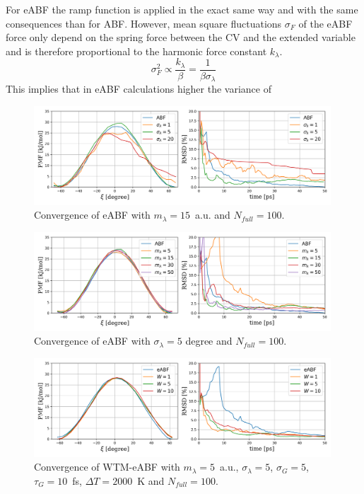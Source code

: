 For eABF the ramp function is applied in the exact same way and with the same consequences than for ABF.\autocite{lesage2017smoothed}
However, mean square fluctuations $\sigma_F$ of the eABF force only depend on the spring force between the CV and the extended variable and is therefore proportional to the harmonic force constant $k_\lambda$.
\begin{equation}
    \sigma_F^2 \propto \frac{k_\lambda}{\beta} = \frac{1}{\beta\sigma_\lambda}
\end{equation}
This implies that in eABF calculations higher the variance of
\begin{figure}[H]
  \centering
    \includegraphics[width=0.99\textwidth]{bilder/benchmark/eABF_benchmark_sigma}
   \caption{Convergence of eABF with $m_\lambda=15$~a.u. and $N_{full}=100$.}
   \label{fig:conf eABF sigma}
\end{figure}

\begin{figure}[H]
  \centering
    \includegraphics[width=0.99\textwidth]{bilder/benchmark/eABF_benchmark_mass}
   \caption{Convergence of eABF with $\sigma_\lambda=5$ degree and $N_{full}=100$.}
   \label{fig:conf eABF mass}
\end{figure}

\begin{figure}[H]
  \centering
    \includegraphics[width=0.99\textwidth]{bilder/benchmark/meta_eABF_benchmark_height}
   \caption{Convergence of WTM-eABF with $m_\lambda=5$~a.u., $\sigma_\lambda=5$, $\sigma_G=5$, $\tau_G=10$~fs, $\Delta T=2000$~K and $N_{full}=100$.}
   \label{fig:conf meABF height}
\end{figure}

